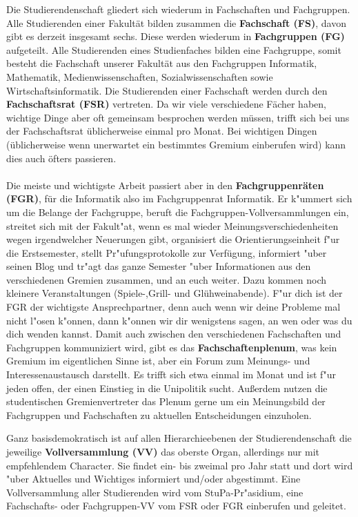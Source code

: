 Die Studierendenschaft gliedert sich wiederum in Fachschaften und Fachgruppen.
Alle Studierenden einer Fakultät bilden zusammen die \textbf{Fachschaft (FS)}, davon gibt es derzeit insgesamt sechs.
Diese werden wiederum in  \textbf{Fachgruppen (FG)} aufgeteilt. Alle Studierenden eines Studienfaches bilden eine Fachgruppe, 
somit besteht die Fachschaft unserer Fakultät aus den Fachgruppen Informatik, Mathematik, Medienwissenschaften, Sozialwissenschaften sowie 
Wirtschaftsinformatik. Die Studierenden einer Fachschaft werden  durch den 
\textbf{Fachschaftsrat (FSR)} vertreten. Da wir viele verschiedene Fächer haben, wichtige Dinge aber oft gemeinsam besprochen werden müssen,
trifft sich bei uns der Fachschaftsrat üblicherweise einmal pro Monat. 
Bei wichtigen Dingen (üblicherweise wenn unerwartet ein bestimmtes Gremium einberufen wird) kann dies auch öfters passieren.
\\
\\
Die meiste und wichtigste Arbeit passiert aber in den \textbf{Fachgruppenräten (FGR)}, 
für die Informatik also im Fachgruppenrat Informatik. Er k"ummert sich um die Belange der
Fachgruppe, beruft die Fachgruppen-Vollversammlungen ein, streitet sich mit der
Fakult"at, wenn es mal wieder Meinungsverschiedenheiten wegen irgendwelcher 
Neuerungen gibt, organisiert die Orientierungseinheit f"ur die Erstsemester, stellt Pr"ufungsprotokolle 
zur Verfügung, informiert 
"uber seinen Blog \fginfoUrl
 und tr"agt das ganze Semester "uber 
Informationen aus den verschiedenen Gremien zusammen, und an euch weiter.
Dazu kommen noch kleinere Veranstaltungen (Spiele-,Grill- und Glühweinabende).
F"ur dich ist der FGR der wichtigste Ansprechpartner, denn auch wenn wir deine Probleme mal nicht l"osen 
k"onnen, dann k"onnen wir dir wenigstens sagen, an wen oder was du dich wenden 
kannst. Damit auch zwischen den verschiedenen Fachschaften
und Fachgruppen kommuniziert wird, 
gibt es das \textbf{Fachschaftenplenum}, was kein Gremium im eigentlichen Sinne 
ist, aber ein Forum zum Meinungs- und Interessenaustausch darstellt. Es trifft 
sich etwa einmal im Monat und ist f"ur jeden offen, der einen Einstieg in die 
Unipolitik sucht. Außerdem nutzen die studentischen Gremienvertreter das Plenum gerne 
um ein Meinungsbild der Fachgruppen und Fachschaften zu aktuellen Entscheidungen einzuholen.

Ganz basisdemokratisch ist auf allen Hierarchie\-ebenen der Studierendenschaft
die jeweilige \textbf{Vollversammlung (VV)} das oberste Organ, allerdings nur
mit empfehlendem Character. Sie findet ein- bis zweimal pro Jahr statt und
dort wird "uber Aktuelles und Wichtiges informiert und/oder abgestimmt. Eine
Vollversammlung aller Studierenden wird vom StuPa-Pr"asidium, eine 
Fachschafts- oder Fachgruppen-VV vom FSR oder FGR einberufen und geleitet.


